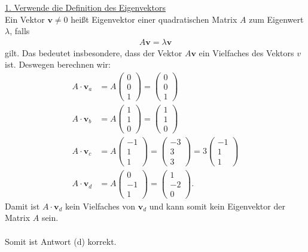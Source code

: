 \underline{1. Verwende die Definition des Eigenvektors}\\
Ein Vektor $\mathbf{v} \neq 0$ heißt Eigenvektor einer quadratischen Matrix $A$ zum Eigenwert $\lambda$, falls
\begin{align*}
	A \mathbf{v} = \lambda \mathbf{v}
\end{align*}
gilt.
Das bedeutet insbesondere, dass der Vektor $A \mathbf{v} $ ein Vielfaches des Vektors $v$ ist. 
Deswegen berechnen wir:
\begin{align*}
	A \cdot \mathbf{v}_a
	&=
	A 
	\begin{pmatrix}
		0\\ 0 \\ 1
	\end{pmatrix}
	=
	\begin{pmatrix}
		0\\ 0 \\ 1
	\end{pmatrix}\\
	A \cdot \mathbf{v}_b
	&=
	A 
	\begin{pmatrix}
		1\\ 1 \\ 0
	\end{pmatrix}
	=
	\begin{pmatrix}
		1\\ 1 \\ 0
	\end{pmatrix}\\
	A \cdot \mathbf{v}_c
	&=
	A 
	\begin{pmatrix}
		-1\\ 1 \\ 1
	\end{pmatrix}
	=
	\begin{pmatrix}
		-3\\ 3 \\ 3
	\end{pmatrix}
	= 3 \begin{pmatrix}
		-1\\ 1 \\ 1
	\end{pmatrix}
	\\
	A \cdot \mathbf{v}_d
	&=
	A 
	\begin{pmatrix}
		0\\ -1 \\ 1
	\end{pmatrix}
	=
	\begin{pmatrix}
		1\\ -2 \\ 0
	\end{pmatrix}.
\end{align*}
Damit ist $A \cdot \mathbf{v}_d$ kein Vielfaches von $ \mathbf{v}_d$ und kann somit kein Eigenvektor der Matrix $A$ sein.\\
\\
Somit ist Antwort (d) korrekt.


